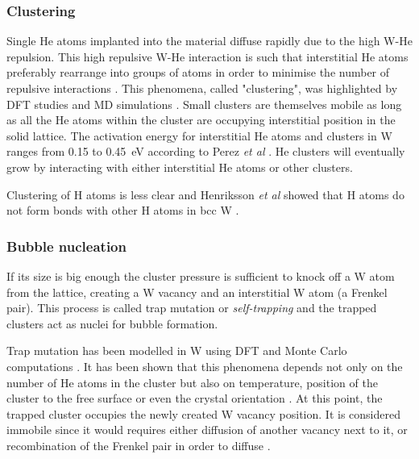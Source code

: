 \subsubsection{Clustering}
Single He atoms implanted into the material diffuse rapidly due to the high W-He repulsion.
This high repulsive W-He interaction is such that interstitial He atoms preferably rearrange into groups of atoms in order to minimise the number of repulsive interactions .
This phenomena, called "clustering", was highlighted by DFT studies \cite{becquart_density_2009,dunn_rate_2013} and MD simulations \cite{henriksson_molecular_2006}.
Small clusters are themselves mobile as long as all the He atoms within the cluster are occupying interstitial position in the solid lattice.
The activation energy for interstitial He atoms and clusters in W ranges from 0.15 to \SI{0.45}{eV} according to Perez \textit{et al} .
He clusters will eventually grow by interacting with either interstitial He atoms or other clusters.

Clustering of H atoms is less clear and Henriksson \textit{et al} showed that H atoms do not form bonds with other H atoms in bcc W .

\subsubsection{Bubble nucleation}

If its size is big enough the cluster pressure is sufficient to knock off a W atom from the lattice, creating a W vacancy and an interstitial W atom (a Frenkel pair).
This process is called trap mutation or \textit{self-trapping} and the trapped clusters act as nuclei for bubble formation.

Trap mutation has been modelled in W using DFT  and Monte Carlo computations .
It has been shown that this phenomena depends not only on the number of He atoms in the cluster but also on temperature, position of the cluster to the free surface or even the crystal orientation .
At this point, the trapped cluster occupies the newly created W vacancy position.
It is considered immobile since it would requires either diffusion of another vacancy next to it, or recombination of the Frenkel pair in order to diffuse .

